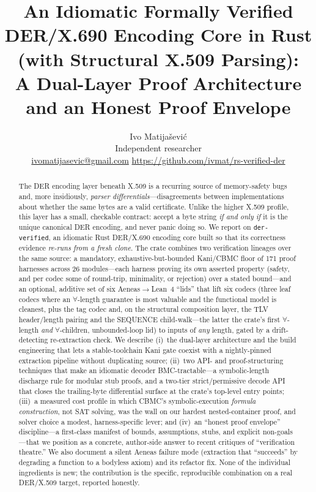 \documentclass[10pt,twocolumn]{article}
\title{\vspace{-2.5em}An Idiomatic Formally Verified DER/X.690 Encoding Core in
Rust (with Structural X.509 Parsing):\\
A Dual-Layer Proof Architecture and an Honest Proof Envelope}
\author{Ivo Matija\v{s}evi\'c\\
\small Independent researcher\\
\small \href{mailto:ivomatijasevic@gmail.com}{ivomatijasevic@gmail.com} \quad
\small \url{https://github.com/ivmat/rs-verified-der}}
\date{}
\newcommand{\code}[1]{\texttt{\small #1}}
\newcommand{\crate}{\code{der-verified}}
\begin{document}
\maketitle

\begin{abstract}
The DER encoding layer beneath X.509 is a recurring source of memory-safety
bugs and, more insidiously, \emph{parser differentials}---disagreements
between implementations about whether the same bytes are a valid certificate.
Unlike the higher X.509 profile, this layer has a small, checkable contract:
accept a byte string \emph{if and only if} it is the unique canonical DER
encoding, and never panic doing so. We report on \crate{}, an idiomatic Rust
DER/X.690 encoding core built so that its correctness evidence
\emph{re-runs from a fresh clone}. The crate combines two verification
lineages over the same source: a mandatory, exhaustive-but-bounded Kani/CBMC
floor of 171 proof harnesses across 26 modules---each harness proving its own
asserted property (safety, and per codec some of round-trip, minimality, or
rejection) over a stated bound---and an optional, additive set of six
Aeneas${\to}$Lean~4 ``lids'' that lift six codecs (three leaf codecs where an
$\forall$-length guarantee is most valuable and the functional model is
cleanest, plus the tag codec and, on the structural composition layer, the
TLV header/length pairing and the SEQUENCE child-walk---the latter the
crate's first $\forall$-length \emph{and} $\forall$-children, unbounded-loop
lid) to inputs of \emph{any} length, gated by a drift-detecting re-extraction
check.
We describe (i)~the dual-layer architecture and the build engineering that
lets a stable-toolchain Kani gate coexist with a nightly-pinned extraction
pipeline without duplicating source; (ii)~two API- and proof-structuring
techniques that make an idiomatic decoder BMC-tractable---a symbolic-length
discharge rule for modular stub proofs, and a two-tier strict/permissive
decode API that closes the trailing-byte differential surface at the crate's
top-level entry points; (iii)~a measured cost profile in which CBMC's
symbolic-execution \emph{formula construction}, not SAT solving, was the wall
on our hardest nested-container proof, and solver choice a modest,
harness-specific lever; and
(iv)~an ``honest proof envelope'' discipline---a first-class manifest of
bounds, assumptions, stubs, and explicit non-goals---that we position as a
concrete, author-side answer to recent critiques of ``verification theatre.''
We also document a silent Aeneas failure mode (extraction that ``succeeds'' by
degrading a function to a bodyless axiom) and its refactor fix. None of the
individual ingredients is new; the contribution is the specific, reproducible
combination on a real DER/X.509 target, reported honestly.
\end{abstract}
\end{document}
